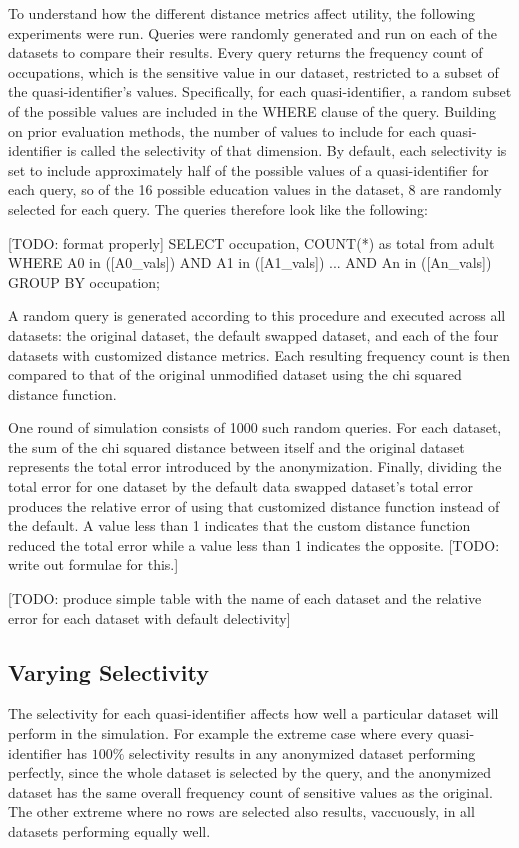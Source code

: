 To understand how the different distance metrics affect utility, the following experiments were run. Queries were randomly generated and run on each of the datasets to compare their results. Every query returns the frequency count of occupations, which is the sensitive value in our dataset, restricted to a subset of the quasi-identifier's values. Specifically, for each quasi-identifier, a random subset of the possible values are included in the WHERE clause of the query. Building on prior evaluation methods\cite{xiaoAnatomy}, the number of values to include for each quasi-identifier is called the selectivity of that dimension. By default, each selectivity is set to include approximately half of the possible values of a quasi-identifier for each query, so of the 16 possible education values in the dataset, 8 are randomly selected for each query. The queries therefore look like the following:

[TODO: format properly]
SELECT occupation, COUNT(*) as total from adult WHERE A0 in ([A0\_vals]) AND A1 in ([A1\_vals]) ... AND An in ([An\_vals]) GROUP BY occupation;

A random query is generated according to this procedure and executed across all datasets: the original dataset, the default swapped dataset, and each of the four datasets with customized distance metrics. Each resulting frequency count is then compared to that of the original unmodified dataset using the chi squared distance function.

One round of simulation consists of 1000 such random queries. For each dataset, the sum of the chi squared distance between itself and the original dataset represents the total error introduced by the anonymization. Finally, dividing the total error for one dataset by the default data swapped dataset's total error produces the relative error of using that customized distance function instead of the default. A value less than 1 indicates that the custom distance function reduced the total error while a value less than 1 indicates the opposite.
[TODO: write out formulae for this.]

[TODO: produce simple table with the name of each dataset and the relative error for each dataset with default delectivity]

\subsection{Varying Selectivity}
The selectivity for each quasi-identifier affects how well a particular dataset will perform in the simulation. For example the extreme case where every quasi-identifier has $100\%$ selectivity results in any anonymized dataset performing perfectly, since the whole dataset is selected by the query, and the anonymized dataset has the same overall frequency count of sensitive values as the original. The other extreme where no rows are selected also results, vaccuously, in all datasets performing equally well.

